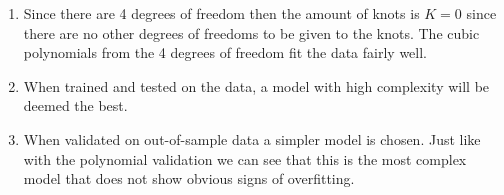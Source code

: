 \documentclass{article}
\begin{document}
\begin{enumerate}
\begin{enumerate}
        \item
        
        Since there are 4 degrees of freedom then the amount of knots is $K = 0$ since there are no other degrees of freedoms to be given to the knots. The cubic polynomials from the 4 degrees of freedom fit the data fairly well.
        
        \item
        
        When trained and tested on the data, a model with high complexity will be deemed the best.
        
        \item
        
        When validated on out-of-sample data a simpler model is chosen. Just like with the polynomial validation we can see that this is the most complex model that does not show obvious signs of overfitting.
        
    \end{enumerate}
    
\end{enumerate}
\end{document}
